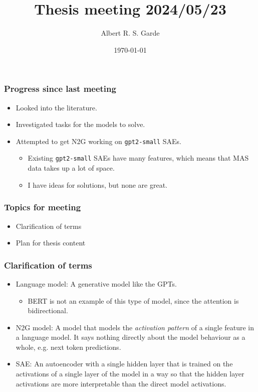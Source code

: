 \documentclass[aspectratio=169]{beamer}
\title{Thesis meeting 2024/05/23}
\author{Albert R. S. Garde}
\date{\today}
\begin{document}
\frame{
	\maketitle
}

\begin{frame}[fragile=singleslide]
	\frametitle{Progress since last meeting}
    \begin{itemize}
        \item Looked into the literature.
        \item Investigated tasks for the models to solve.
        \item Attempted to get N2G working on \texttt{gpt2-small} SAEs.
        \begin{itemize}
            \item Existing \texttt{gpt2-small} SAEs have many features, which means that MAS data takes up a lot of space.
            \item I have ideas for solutions, but none are great.
        \end{itemize}
    \end{itemize}
\end{frame}
\begin{frame}[fragile=singleslide]
    \frametitle{Topics for meeting}
    \begin{itemize}
        \item Clarification of terms
        \item Plan for thesis content
    \end{itemize}
\end{frame}
\begin{frame}[fragile=singleslide]
    \frametitle{Clarification of terms}
    \begin{itemize}
        \item Language model: A generative model like the GPTs. 
        \begin{itemize}
            \item BERT is not an example of this type of model, since the attention is bidirectional.
        \end{itemize}
        \item N2G model: A model that models the \emph{activation pattern} of a single feature in a language model.
        It says nothing directly about the model behaviour as a whole, e.g. next token predictions.
        \item SAE: An autoencoder with a single hidden layer that is trained on the activations of a single layer of the model 
        in a way so that the hidden layer activations are more interpretable than the direct model activations.
    \end{itemize}
\end{frame}
\end{document}
